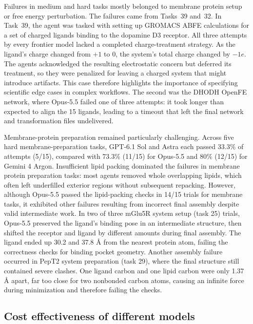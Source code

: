 Failures in medium and hard tasks mostly belonged to membrane protein setup or free energy perturbation. The failures came from Tasks~39 and~32. In Task~39, the agent was tasked with setting up GROMACS ABFE calculations for a set of charged ligands binding to the dopamine D3 receptor. All three attempts by every frontier model lacked a completed charge-treatment strategy. As the ligand's charge changed from $+1$ to $0$, the system's total charge changed by $-1e$. The agents acknowledged the resulting electrostatic concern but deferred its treatment, so they were penalized for leaving a charged system that might introduce artifacts. This case therefore highlights the importance of specifying scientific edge cases in complex workflows. The second was the DHODH OpenFE network, where Opus-5.5 failed one of three attempts: it took longer than expected to align the 15 ligands, leading to a timeout that left the final network and transformation files undelivered.

Membrane-protein preparation remained particularly challenging. Across five hard membrane-preparation tasks, GPT-6.1 Sol and Astra each passed 33.3\% of attempts (5/15), compared with 73.3\% (11/15) for Opus-5.5 and 80\% (12/15) for Gemini 4 Argon. Insufficient lipid packing dominated the failures in membrane protein preparation tasks: most agents removed whole overlapping lipids, which often left underfilled exterior regions without subsequent repacking. However, although Opus-5.5 passed the lipid-packing checks in 14/15 trials for membrane tasks, it exhibited other failures resulting from incorrect final assembly despite valid intermediate work. In two of three mGlu5R system setup (task 25) trials, Opus-5.5 preserved the ligand’s binding pose in an intermediate structure, then shifted the receptor and ligand by different amounts during final assembly. The ligand ended up 30.2 and 37.8 Å from the nearest protein atom, failing the correctness checks for binding pocket geometry. Another assembly failure occurred in PepT2 system preparation (task 29), where the final structure still contained severe clashes. One ligand carbon and one lipid carbon were only 1.37 Å apart, far too close for two nonbonded carbon atoms, causing an infinite force during minimization and therefore failing the checks.



\subsection{Cost effectiveness of different models}

